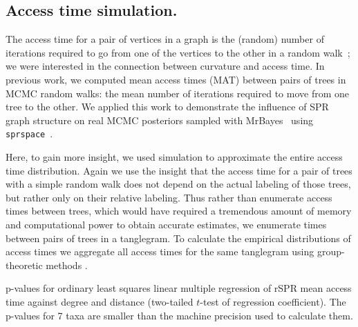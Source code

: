 \documentclass[10pt,twoside,leqno,twocolumn]{article}
\let\MYoriglatexcaption\caption
\renewcommand{\caption}[2][\relax]{\MYoriglatexcaption[#2]{#2}}
\newcommand{\cuttable}[2][]{%
    \ifthenelse{\equal{#1}{}}%
		{}%
		{#1}%
}
\begin{document}
\subsection{Access time simulation.}
The access time for a pair of vertices in a graph is the (random) number of iterations required to go from one of the vertices to the other in a random walk~\cite{lovasz1993random}; we were interested in the connection between curvature and access time.
In previous work, we computed mean access times (MAT) between pairs of trees in  MCMC random walks: the mean number of iterations required to move from one tree to the other.
We applied this work to demonstrate the influence of SPR graph structure on real MCMC posteriors sampled with MrBayes~\cite{Whidden2015-yi} using \texttt{sprspace}~\cite{sprspace}.

Here, to gain more insight, we used simulation to approximate the entire access time distribution.
Again we use the insight that the access time for a pair of trees with a simple random walk does not depend on the actual labeling of those trees, but rather only on their relative labeling.
Thus rather than enumerate access times between trees, which would have required a tremendous amount of memory and computational power to obtain accurate estimates, we enumerate times between pairs of trees in a tanglegram.
To calculate the empirical distributions of access times we aggregate all access times for the same tanglegram using \cuttable{our }group-theoretic methods \cite{tangle}.

\begin{table}
\centering
\caption{p-values for ordinary least squares linear multiple regression of rSPR mean access time against degree and distance (two-tailed $t$-test of regression coefficient). The p-values for 7 taxa are smaller than the machine precision used to calculate them.}
\label{tab:regressionMAT}
\end{table}
\end{document}
